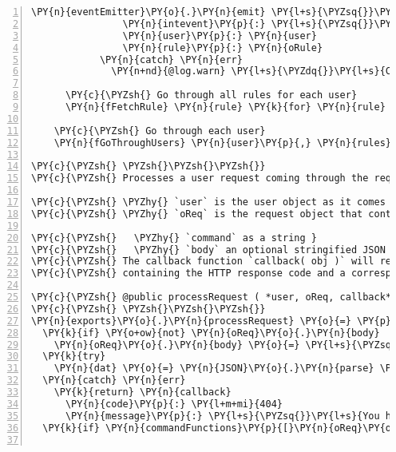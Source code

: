 \begin{Verbatim}[fontsize=\scriptsize,commandchars=\\\{\},numbers=left,firstnumber=1,stepnumber=1]
              \PY{n}{eventEmitter}\PY{o}{.}\PY{n}{emit} \PY{l+s}{\PYZsq{}}\PY{l+s}{rule}\PY{l+s}{\PYZsq{}}\PY{p}{,}
                \PY{n}{intevent}\PY{p}{:} \PY{l+s}{\PYZsq{}}\PY{l+s}{init}\PY{l+s}{\PYZsq{}}
                \PY{n}{user}\PY{p}{:} \PY{n}{user}
                \PY{n}{rule}\PY{p}{:} \PY{n}{oRule}
            \PY{n}{catch} \PY{n}{err}
              \PY{n+nd}{@log.warn} \PY{l+s}{\PYZdq{}}\PY{l+s}{CM | There}\PY{l+s}{\PYZsq{}}\PY{l+s}{s an invalid rule in the system: \PYZsh{}\PYZob{} strRule \PYZcb{}}\PY{l+s}{\PYZdq{}}

      \PY{c}{\PYZsh{} Go through all rules for each user}
      \PY{n}{fFetchRule} \PY{n}{rule} \PY{k}{for} \PY{n}{rule} \PY{o+ow}{in} \PY{n}{rules}
          
    \PY{c}{\PYZsh{} Go through each user}
    \PY{n}{fGoThroughUsers} \PY{n}{user}\PY{p}{,} \PY{n}{rules} \PY{k}{for} \PY{n}{user}\PY{p}{,} \PY{n}{rules} \PY{n}{of} \PY{n}{objUsers}

\PY{c}{\PYZsh{} \PYZsh{}\PYZsh{}\PYZsh{}}
\PY{c}{\PYZsh{} Processes a user request coming through the request\PYZhy{}handler.}

\PY{c}{\PYZsh{} \PYZhy{} `user` is the user object as it comes from the DB.}
\PY{c}{\PYZsh{} \PYZhy{} `oReq` is the request object that contains:}

\PY{c}{\PYZsh{}   \PYZhy{} `command` as a string }
\PY{c}{\PYZsh{}   \PYZhy{} `body` an optional stringified JSON object }
\PY{c}{\PYZsh{} The callback function `callback( obj )` will receive an object}
\PY{c}{\PYZsh{} containing the HTTP response code and a corresponding message.}

\PY{c}{\PYZsh{} @public processRequest ( *user, oReq, callback* )}
\PY{c}{\PYZsh{} \PYZsh{}\PYZsh{}\PYZsh{}}
\PY{n}{exports}\PY{o}{.}\PY{n}{processRequest} \PY{o}{=} \PY{p}{(} \PY{n}{user}\PY{p}{,} \PY{n}{oReq}\PY{p}{,} \PY{n}{callback} \PY{p}{)} \PY{o}{\PYZhy{}}\PY{o}{\PYZgt{}}
  \PY{k}{if} \PY{o+ow}{not} \PY{n}{oReq}\PY{o}{.}\PY{n}{body}
    \PY{n}{oReq}\PY{o}{.}\PY{n}{body} \PY{o}{=} \PY{l+s}{\PYZsq{}}\PY{l+s}{\PYZob{}\PYZcb{}}\PY{l+s}{\PYZsq{}}
  \PY{k}{try}
    \PY{n}{dat} \PY{o}{=} \PY{n}{JSON}\PY{o}{.}\PY{n}{parse} \PY{n}{oReq}\PY{o}{.}\PY{n}{body}
  \PY{n}{catch} \PY{n}{err}
    \PY{k}{return} \PY{n}{callback}
      \PY{n}{code}\PY{p}{:} \PY{l+m+mi}{404}
      \PY{n}{message}\PY{p}{:} \PY{l+s}{\PYZsq{}}\PY{l+s}{You had a strange body in your request!}\PY{l+s}{\PYZsq{}}
  \PY{k}{if} \PY{n}{commandFunctions}\PY{p}{[}\PY{n}{oReq}\PY{o}{.}\PY{n}{command}\PY{p}{]}


\end{Verbatim}
